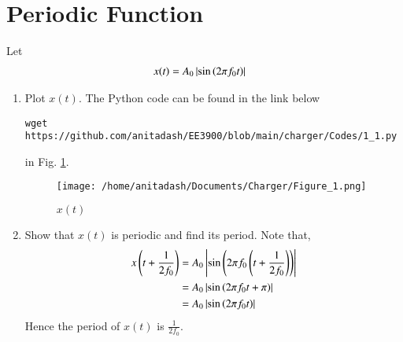 \documentclass[journal,12pt,twocolumn]{IEEEtran}
\renewcommand\thesection{\arabic{section}}
\begin{document}
\section{Periodic Function}
Let 
\begin{align}
	x(t) &= A_0\left\vert\sin\left(2\pi f_0 t\right)\right\vert
	\label{eq:10-orig-diff-def}
\end{align}
\begin{enumerate}[label=\thesection.\arabic*
,ref=\thesection.\theenumi]
\item Plot $x(t)$.
\solution The Python code can be found in the link below
\begin{lstlisting}
wget https://github.com/anitadash/EE3900/blob/main/charger/Codes/1_1.py
\end{lstlisting}
in Fig. \ref{fig:xt}.
\begin{figure}[!htp]
    \texttt{[image: /home/anitadash/Documents/Charger/Figure\_1.png]}
    \caption{$x(t)$}
    \label{fig:xt}
\end{figure}
\item Show that $x(t)$ is periodic and find its period.
\solution Note that,
\begin{align}
    x\left(t+\frac{1}{2f_0}\right) &= A_0\left\vert\sin\left(2\pi f_0\left(t + \frac{1}{2f_0}\right)\right)\right\vert \\
                            &= A_0\left\vert\sin\left(2\pi f_0t + \pi\right)\right\vert \\
                            &= A_0\left\vert\sin\left(2\pi f_0t\right)\right\vert
\end{align}
Hence the period of $x(t)$ is $\frac{1}{2f_0}$.
\end{enumerate}
\end{document}
